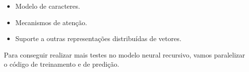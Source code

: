 \begin{itemize}

\item Modelo de caracteres.

\item Mecanismos de atenção.

\item Suporte a outras representações distribuídas de vetores.

\end{itemize}


Para conseguir realizar mais testes no modelo neural recursivo, vamos paralelizar o código de treinamento e de predição.




